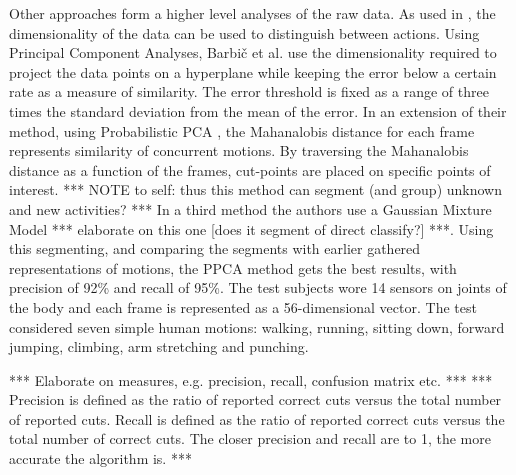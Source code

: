 Other approaches form a higher level analyses of the raw data.
As used in \cite{barbivc2004segmenting}, the dimensionality of the data can be used to distinguish between actions.
Using Principal Component Analyses, Barbi{\v{c}} et al. use the dimensionality required to project the data points on a hyperplane while keeping the error below a certain rate as a measure of similarity.
The error threshold is fixed as a range of three times the standard deviation from the mean of the error.
In an extension of their method, using Probabilistic PCA \cite{tipping1999probabilistic}, the Mahanalobis distance \cite{duda1995pattern} for each frame represents similarity of concurrent motions.
By traversing the Mahanalobis distance as a function of the frames, cut-points are placed on specific points of interest.
*** NOTE to self: thus this method can segment (and group) unknown and new activities? ***
In a third method the authors use a Gaussian Mixture Model *** elaborate on this one [does it segment of direct classify?] ***.
Using this segmenting, and comparing the segments with earlier gathered representations of motions, the PPCA method gets the best results, with precision of 92\% and recall of 95\%.
The test subjects wore 14 sensors on joints of the body and each frame is represented as a 56-dimensional vector.
The test considered seven simple human motions: walking, running, sitting down, forward jumping, climbing, arm stretching and punching.




*** Elaborate on measures, e.g. precision, recall, confusion matrix etc.  ***
*** Precision is defined as the ratio of reported correct cuts versus the total number of reported cuts. Recall is defined as the ratio of reported correct cuts versus the total number of correct cuts. The closer precision and recall are to 1, the more accurate the algorithm is. ***